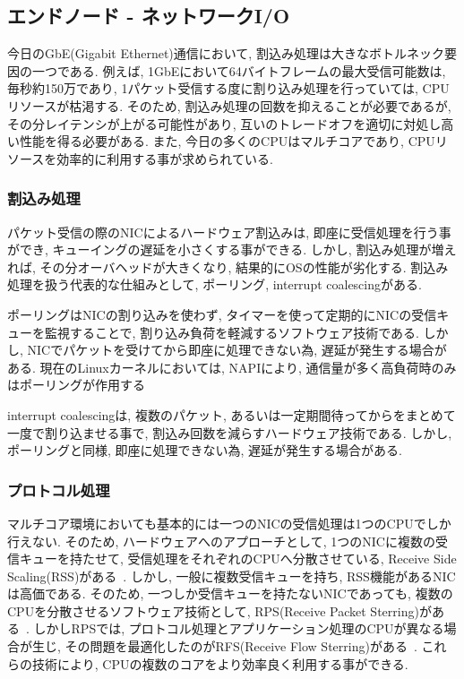 \documentclass[11pt, a4paper, twocolumn]{jsarticle}
\begin{document}
\subsection{エンドノード - ネットワークI/O}
\label{sec:networl_io}
今日のGbE(Gigabit Ethernet)通信において, 割込み処理は大きなボトルネック要因の一つである.
例えば, 1GbEにおいて64バイトフレームの最大受信可能数は, 毎秒約150万であり, 1パケット受信する度に割り込み処理を行っていては,
CPUリソースが枯渇する.
そのため, 割込み処理の回数を抑えることが必要であるが, その分レイテンシが上がる可能性があり, 互いのトレードオフを適切に対処し高い性能を得る必要がある.
また, 今日の多くのCPUはマルチコアであり, CPUリソースを効率的に利用する事が求められている.
\subsubsection{割込み処理}
パケット受信の際のNICによるハードウェア割込みは, 即座に受信処理を行う事ができ, キューイングの遅延を小さくする事ができる.
しかし, 割込み処理が増えれば, その分オーバヘッドが大きくなり, 結果的にOSの性能が劣化する.
割込み処理を扱う代表的な仕組みとして, ポーリング, interrupt coalescingがある.

ポーリングはNICの割り込みを使わず, タイマーを使って定期的にNICの受信キューを監視することで, 割り込み負荷を軽減するソフトウェア技術である.
しかし, NICでパケットを受けてから即座に処理できない為, 遅延が発生する場合がある.
現在のLinuxカーネルにおいては, NAPIにより, 通信量が多く高負荷時のみはポーリングが作用する~\cite{NAPI}

interrupt coalescingは, 複数のパケット, あるいは一定期間待ってからをまとめて一度で割り込ませる事で,
割込み回数を減らすハードウェア技術である.
しかし, ポーリングと同様, 即座に処理できない為, 遅延が発生する場合がある.

\subsubsection{プロトコル処理}
マルチコア環境においても基本的には一つのNICの受信処理は1つのCPUでしか行えない.
そのため, ハードウェアへのアプローチとして, 1つのNICに複数の受信キューを持たせて, 受信処理をそれぞれのCPUへ分散させている, Receive
Side Scaling(RSS)がある~\cite{RSS}.
しかし, 一般に複数受信キューを持ち, RSS機能があるNICは高価である.
そのため, 一つしか受信キューを持たないNICであっても, 複数のCPUを分散させるソフトウェア技術として, RPS(Receive Packet
Sterring)がある~\cite{RPS}.
しかしRPSでは, プロトコル処理とアプリケーション処理のCPUが異なる場合が生じ, その問題を最適化したのがRFS(Receive Flow
Sterring)がある~\cite{RFS}.
これらの技術により, CPUの複数のコアをより効率良く利用する事ができる.
\end{document}
